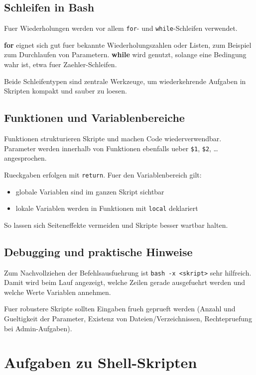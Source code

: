 \documentclass[11pt, oneside, numbers=noenddot]{scrbook}
\begin{document}
\section{Schleifen in Bash}
Fuer Wiederholungen werden vor allem \texttt{for}- und \texttt{while}-Schleifen verwendet.

\textbf{for} eignet sich gut fuer bekannte Wiederholungszahlen oder Listen, zum Beispiel zum Durchlaufen von Parametern. \textbf{while} wird genutzt, solange eine Bedingung wahr ist, etwa fuer Zaehler-Schleifen.

Beide Schleifentypen sind zentrale Werkzeuge, um wiederkehrende Aufgaben in Skripten kompakt und sauber zu loesen.

\section{Funktionen und Variablenbereiche}
Funktionen strukturieren Skripte und machen Code wiederverwendbar. Parameter werden innerhalb von Funktionen ebenfalls ueber \texttt{\$1}, \texttt{\$2}, \dots angesprochen.

Rueckgaben erfolgen mit \texttt{return}. Fuer den Variablenbereich gilt:
\begin{itemize}
\item globale Variablen sind im ganzen Skript sichtbar
\item lokale Variablen werden in Funktionen mit \texttt{local} deklariert
\end{itemize}
So lassen sich Seiteneffekte vermeiden und Skripte besser wartbar halten.

\section{Debugging und praktische Hinweise}
Zum Nachvollziehen der Befehlsausfuehrung ist \texttt{bash -x <skript>} sehr hilfreich. Damit wird beim Lauf angezeigt, welche Zeilen gerade ausgefuehrt werden und welche Werte Variablen annehmen.

Fuer robustere Skripte sollten Eingaben frueh geprueft werden (Anzahl und Gueltigkeit der Parameter, Existenz von Dateien/Verzeichnissen, Rechtepruefung bei Admin-Aufgaben).

\chapter{Aufgaben zu Shell-Skripten}
\end{document}
